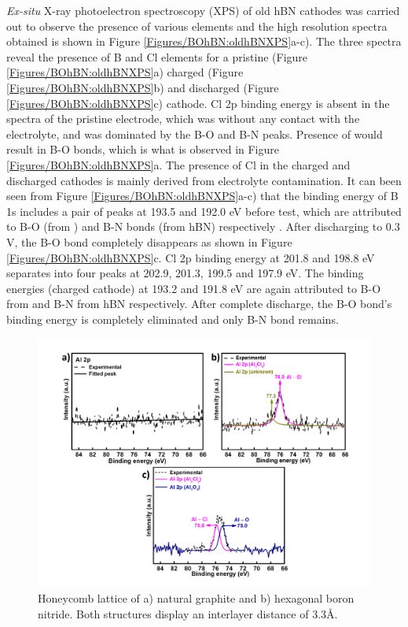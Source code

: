\textit{Ex-situ} X-ray photoelectron spectroscopy (XPS) of old hBN cathodes was carried out to observe the presence of various elements and the high resolution spectra obtained is shown in Figure \ref{Figures/BOhBN:oldhBNXPS}a-c). The three spectra reveal the presence of B and Cl elements for a pristine (Figure \ref{Figures/BOhBN:oldhBNXPS}a) charged (Figure \ref{Figures/BOhBN:oldhBNXPS}b) and discharged (Figure \ref{Figures/BOhBN:oldhBNXPS}c) cathode. Cl 2p binding energy is absent in the spectra of the pristine electrode, which was without any contact with the electrolyte, and was dominated by the B-O and B-N peaks. Presence of  would result in B-O bonds, which is what is observed in Figure \ref{Figures/BOhBN:oldhBNXPS}a. The presence of Cl in the charged and discharged cathodes is mainly derived from electrolyte contamination. It can been seen from Figure \ref{Figures/BOhBN:oldhBNXPS}a-c) that the binding energy of B 1s includes a pair of peaks at 193.5 and 192.0 eV before test, which are attributed to B-O (from ) and B-N bonds (from hBN) respectively \cite{ghsf}. After discharging to 0.3 V, the B-O bond completely disappears as shown in Figure \ref{Figures/BOhBN:oldhBNXPS}c. Cl 2p binding energy at 201.8 and 198.8 eV separates into four peaks at 202.9, 201.3, 199.5 and 197.9 eV. The binding energies (charged cathode) at 193.2 and 191.8 eV are again attributed to B-O from  and B-N from hBN respectively. After complete discharge, the B-O bond's binding energy is completely eliminated and only B-N bond remains.

\begin{figure}[tbh!]
\centering
\includegraphics[width=\textwidth]{Figures/BOhBN/hBNAlXPS}
\caption{Honeycomb lattice of a) natural graphite and b) hexagonal boron nitride. Both structures display an interlayer distance of 3.3\AA.}
\label{Figures/BOhBN:hBNAlXPS}
\end{figure}

